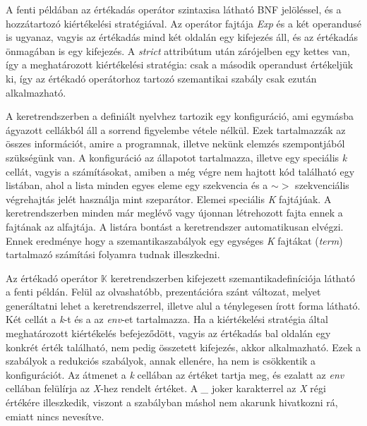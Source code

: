 A fenti példában az értékadás operátor szintaxisa látható BNF jelöléssel, és a hozzátartozó kiértékelési stratégiával. Az operátor fajtája \textit{Exp} és a két operandusé is ugyanaz, vagyis az értékadás mind két oldalán egy kifejezés áll, és az értékadás önmagában is egy kifejezés. A \textit{strict} attribútum után zárójelben egy kettes van, így a meghatározott kiértékelési stratégia: csak a második operandust értékeljük ki, így az értékadó operátorhoz tartozó szemantikai szabály csak ezután alkalmazható.



A keretrendszerben a definiált nyelvhez tartozik egy konfiguráció, ami egymásba ágyazott cellákból áll a sorrend figyelembe vétele nélkül. Ezek tartalmazzák az összes információt, amire a programnak, illetve nekünk elemzés szempontjából szükségünk van. A konfiguráció az állapotot tartalmazza, illetve egy speciális \textit{k} cellát, vagyis a számításokat, amiben a még végre nem hajtott kód található egy listában, ahol a lista minden egyes eleme egy szekvencia és a $\sim>$ szekvenciális végrehajtás jelét használja mint szeparátor. Elemei speciális \textit{K} fajtájúak. A keretrendszerben minden már meglévő vagy újonnan létrehozott fajta ennek a fajtának az alfajtája. A listára bontást a keretrendszer automatikusan elvégzi. Ennek eredménye hogy a szemantikaszabályok egy egységes \textit{K} fajtákat (\textit{term}) tartalmazó számítási folyamra tudnak illeszkedni.



Az értékadó operátor $\mathbb{K}$ keretrendszerben kifejezett szemantikadefiníciója látható a fenti példán. Felül az olvashatóbb, prezentációra szánt változat, melyet generáltatni lehet a keretrendszerrel, illetve alul a ténylegesen írott forma látható. Két cellát a \textit{k}-t és a az \textit{env}-et tartalmazza. Ha a kiértékelési stratégia által meghatározott kiértékelés befejeződött, vagyis az értékadás bal oldalán egy konkrét érték található, nem pedig összetett kifejezés, akkor alkalmazható. Ezek a szabályok a redukciós szabályok, annak ellenére, ha nem is csökkentik a konfigurációt. Az átmenet a \textit{k} cellában az értéket tartja meg, és ezalatt az \textit{env} cellában felülírja az \textit{X}-hez rendelt értéket. A \textit{\_} joker karakterrel az \textit{X} régi értékére illeszkedik, viszont a szabályban máshol nem akarunk hivatkozni rá, emiatt nincs nevesítve.

